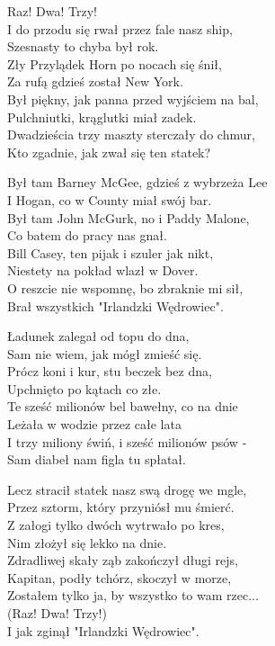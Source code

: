 \begin{text}
   
    Raz! Dwa! Trzy!\\
    I do przodu się rwał przez fale nasz ship,\\
    Szesnasty to chyba był rok.\\
    Zły Przylądek Horn po nocach się śnił,\\
    Za rufą gdzieś został New York.\\
    Był piękny, jak panna przed wyjściem na bal,\\
    Pulchniutki, krąglutki miał zadek.\\
    Dwadzieścia trzy maszty sterczały do chmur,\\
    Kto zgadnie, jak zwał się ten statek?

    Był tam Barney McGee, gdzieś z wybrzeża Lee\\
    I Hogan, co w County miał swój bar.\\
    Był tam John McGurk, no i Paddy Malone,\\
    Co batem do pracy nas gnał.\\
    Bill Casey, ten pijak i szuler jak nikt,\\
    Niestety na pokład wlazł w Dover.\\
    O reszcie nie wspomnę, bo zbraknie mi sił,\\
    Brał wszystkich "Irlandzki Wędrowiec".

    Ładunek zalegał od topu do dna,\\
    Sam nie wiem, jak mógł zmieść się.\\
    Prócz koni i kur, stu beczek bez dna,\\
    Upchnięto po kątach co złe.\\
    Te sześć milionów bel bawełny, co na dnie\\
    Leżała w wodzie przez całe lata\\
    I trzy miliony świń, i sześć milionów psów -\\
    Sam diabeł nam figla tu spłatał.

    Lecz stracił statek nasz swą drogę we mgle,\\
    Przez sztorm, który przyniósł mu śmierć.\\
    Z załogi tylko dwóch wytrwało po kres,\\
    Nim złożył się lekko na dnie.\\
    Zdradliwej skały ząb zakończył długi rejs,\\
    Kapitan, podły tchórz, skoczył w morze,\\
    Zostałem tylko ja, by wszystko to wam rzec...\\
    (Raz! Dwa! Trzy!)\\
    I jak zginął "Irlandzki Wędrowiec".
  

\end{text}
